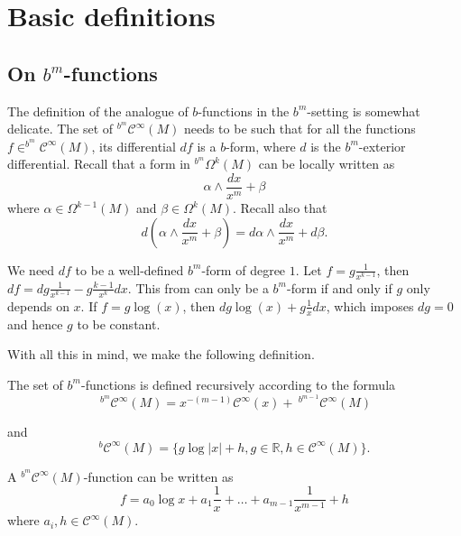 \section{Basic definitions}
\subsection{On $b^m$-functions}
 The definition of the analogue of $b$-functions in the $b^m$-setting is somewhat delicate. The set of $^{b^m}\mathcal{C}^\infty(M)$ needs to be such that for all the functions $f\in ^{b^m}\mathcal{C}^\infty(M)$, its differential $df$ is a $b$-form, where $d$ is the $b^m$-exterior differential.
Recall that a form in $^{b^m}\Omega^k(M)$ can be locally written as
$$\alpha\wedge\frac{dx}{x^m} + \beta$$
where $\alpha \in \Omega^{k-1}(M)$ and $\beta \in \Omega^{k}(M)$. Recall also that
$$d\left(\alpha\wedge\frac{dx}{x^m} + \beta\right) = d\alpha\wedge\frac{dx}{x^m} + d\beta.$$

We need $df$ to be a well-defined $b^m$-form of degree $1$. Let $f = g\frac{1}{x^{k-1}}$, then $df = dg \frac{1}{x^{k-1}} - g\frac{k-1}{x^k}dx$. This from can only be a $b^m$-form if and only if $g$ only depends on $x$. If $f = g\log(x)$, then $dg\log(x) + g\frac{1}{x}dx$, which imposes $dg=0$ and hence $g$ to be constant.

With all this in mind, we make the following definition.
\begin{definition}
The set of $b^m$-functions is defined recursively according to the formula $$~^{b^m} \mathcal{C}^\infty(M)= x^{-(m-1)}\mathcal{C}^\infty(x) + ~^{b^{m-1}} \mathcal{C}^\infty(M)$$

 and $$^{b}\mathcal{C}^\infty(M)=\{ g \log\vert x\vert+ h, g \in \mathbb{R}, h\in \mathcal{C}^\infty(M)\}.$$


\end{definition}


\begin{remark}
A $^{b^m} \mathcal{C}^\infty (M)$-function can be written as
$$f = a_0 \log x + a_1\frac{1}{x} + \ldots + a_{m-1}\frac{1}{x^{m-1}} + h$$
where $a_i, h \in \mathcal{C}^\infty(M)$.
\end{remark}


